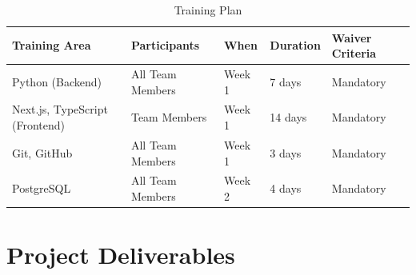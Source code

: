\begin{table}[H]
	\centering
	\small
	\caption{Training Plan}
	\begin{tabularx}{\textwidth}{|Y|Y|L{2cm}|L{2cm}|Y|}
		\hline
		\textbf{Training Area} &
		\textbf{Participants} &
		\textbf{When} &
		\textbf{Duration} &
		\textbf{Waiver Criteria} \\ \hline
		
		Python (Backend) & All Team Members & Week 1 & 7 days & Mandatory \\ \hline
		Next.js, TypeScript (Frontend) & Team Members & Week 1 & 14 days & Mandatory \\ \hline
		Git, GitHub & All Team Members & Week 1 & 3 days & Mandatory \\ \hline
		PostgreSQL & All Team Members & Week 2 & 4 days & Mandatory \\ \hline
		
	\end{tabularx}
\end{table}


\section{Project Deliverables}

